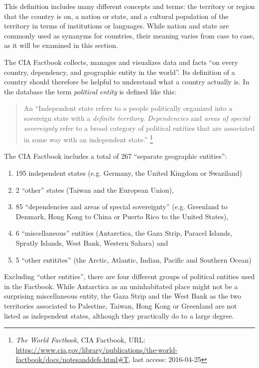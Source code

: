 This definition includes many different concepts and terms: the territory or region that the country is on, a nation or state, and a cultural population of the territory in terms of institutions or languages. While nation and state are commonly used as synanyms for countries, their meaning varies from case to case, as it will be examined in this section.

The CIA Factbook collects, manages and visualizes data and facts ``on every country, dependency, and geographic entity in the world''. Its definition of a country should therefore be helpful to understand what a country actually is. In the database the term \emph{political entity} is defined like this:
\begin{quote}
  An ``Independent state refers to a people politically organized into a sovereign state with a \emph{definite territory}. \emph{Dependencies} and \emph{areas of special sovereignty} refer to a broad category of political entities that are associated in some way with an independent state.''
  \footnote{\textit{The World Factbook}, CIA Factbook, URL: \url{https://www.cia.gov/library/publications/the-world-factbook/docs/notesanddefs.html\#T}, last access: 2016-04-25}
\end{quote}

The CIA Factbook includes a total of 267 ``separate geographic entities'':
\begin{enumerate}
  \item 195 independent states (e.g. Germany, the United Kingdom or Swaziland)
  \item 2 ``other'' states (Taiwan and the European Union),
  \item 85 ``dependencies and areas of special sovereignty'' (e.g. Greenland to Denmark, Hong Kong to China or Puerto Rico to the United States),
  \item 6 ``miscellaneous'' entities (Antarctica, the Gaza Strip, Paracel Islands, Spratly Islands, West Bank, Western Sahara) and
  \item 5 ``other entitites'' (the Arctic, Atlantic, Indian, Pacific and Southern Ocean)
\end{enumerate}

Excluding ``other entities'', there are four different groups of political entities used in the Factbook. While Antarctica as an uninhabitated place might not be a surprising miscellaneous entity, the Gaza Strip and the West Bank as the two territories associated to Palestine, Taiwan, Hong Kong or Greenland are not listed as independent states, although they practically do to a large degree.

